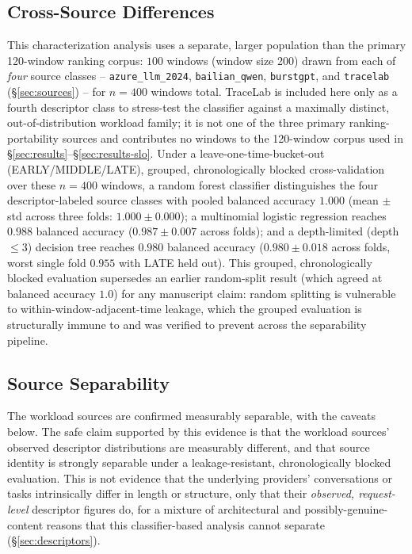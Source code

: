 \subsection{Cross-Source Differences}
\label{sec:cross-source-diffs}

This characterization analysis uses a separate, larger population than the
primary 120-window ranking corpus: $100$ windows (window size 200) drawn
from each of \emph{four} source classes -- \texttt{azure\_llm\_2024},
\texttt{bailian\_qwen}, \texttt{burstgpt}, and \texttt{tracelab}
(\S\ref{sec:sources}) -- for $n=400$ windows total. TraceLab is included
here only as a fourth descriptor class to stress-test the classifier
against a maximally distinct, out-of-distribution workload family; it is
not one of the three primary ranking-portability sources and
contributes no windows to the 120-window corpus used in
\S\ref{sec:results}--\S\ref{sec:results-slo}. Under a leave-one-time-bucket-out (EARLY/MIDDLE/LATE), grouped,
chronologically blocked cross-validation over these $n=400$ windows, a
random forest classifier distinguishes the four
descriptor-labeled source classes with pooled balanced accuracy
$1.000$ (mean $\pm$ std across three folds: $1.000 \pm 0.000$); a
multinomial logistic regression reaches $0.988$ balanced accuracy
($0.987 \pm 0.007$ across folds); and a depth-limited (depth $\le 3$)
decision tree reaches $0.980$ balanced accuracy ($0.980 \pm 0.018$ across
folds, worst single fold $0.955$ with LATE held out). This grouped,
chronologically blocked evaluation supersedes an earlier random-split
result (which agreed at balanced accuracy $1.0$) for any manuscript
claim: random splitting is vulnerable to within-window-adjacent-time
leakage, which the grouped evaluation is structurally immune to and was
verified to prevent across the separability pipeline.

\subsection{Source Separability}
\label{sec:separability}

The workload sources are confirmed measurably separable, with the caveats
below. The safe claim
supported by this evidence is that the workload sources' observed
descriptor distributions are measurably different, and that source identity
is strongly separable under a leakage-resistant, chronologically blocked
evaluation. This is not evidence that the underlying providers'
conversations or tasks intrinsically differ in length or structure, only
that their \emph{observed, request-level} descriptor figures do, for a
mixture of architectural and possibly-genuine-content reasons that this
classifier-based analysis cannot separate (\S\ref{sec:descriptors}).

